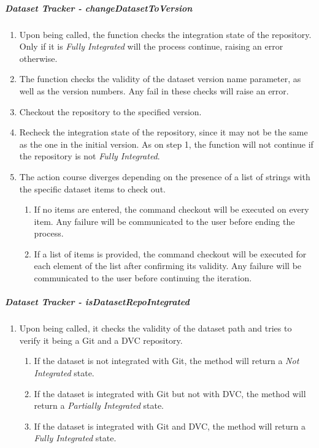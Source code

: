 \subparagraph{Dataset Tracker - changeDatasetToVersion}

\begin{enumerate}
    \item Upon being called, the function checks the integration state of the repository. Only if it is \emph{Fully Integrated} will the process continue, raising an error otherwise.
    
    \item The function checks the validity of the dataset version name parameter, as well as the version numbers. Any fail in these checks will raise an error.
    
    \item Checkout the repository to the specified version.
    
    \item Recheck the integration state of the repository, since it may not be the same as the one in the initial version. As on step 1, the function will not continue if the repository is not \emph{Fully Integrated}.
    
    \item The action course diverges depending on the presence of a list of strings with the specific dataset items to check out.
    \begin{enumerate}
        \item If no items are entered, the command  checkout will be executed on every item. Any failure will be communicated to the user before ending the process.
        \item If a list of items is provided, the command checkout will be executed for each element of the list after confirming its validity. Any failure will be communicated to the user before continuing the iteration.
    \end{enumerate}
\end{enumerate}

\subparagraph{Dataset Tracker - isDatasetRepoIntegrated}

\begin{enumerate}
    \item Upon being called, it checks the validity of the dataset path and tries to verify it being a Git and a DVC repository.
    \begin{enumerate}
        \item If the dataset is not integrated with Git, the method will return a \emph{Not Integrated} state.
        \item If the dataset is integrated with Git but not with DVC, the method will return a \emph{Partially Integrated} state.
        \item If the dataset is integrated with Git and DVC, the method will return a \emph{Fully Integrated} state.
    \end{enumerate}
\end{enumerate}

